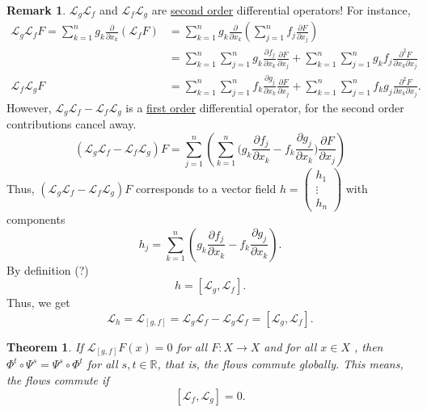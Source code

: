 \documentclass[hidelinks,a4paper, 11pt]{article}
\theoremstyle{plain}
\newtheorem{theorem}{Theorem}
\theoremstyle{break}
\theoremstyle{plain}
\theoremstyle{definition}
\newtheorem*{remark}{Remark}
\begin{document}
\begin{remark}
	$\mathcal L_g \mathcal L_f$ and $\mathcal L_f \mathcal L_g$ are \underline{second order} differential operators! For instance,
	\begin{align*}
		\mathcal L_g\mathcal L_f F = \sum^n_{k=1} g_k \frac{\partial}{\partial x_k}(\mathcal L_f F) &= \sum^n_{k=1} g_k \frac{\partial}{\partial x_k} \left( \sum^n_{j=1} f_j \frac{\partial F}{\partial x_j} \right) \\
		&= \sum^n_{k=1} \sum^n_{j=1} g_k \frac{\partial f_j}{\partial x_k} \frac{\partial F}{\partial x_j} + \sum^n_{k=1}\sum^n_{j=1}g_kf_j \frac{\partial^2F}{\partial x_k \partial x_j} \\
		\mathcal L_f \mathcal L_g F &= \sum^n_{k=1} \sum^n_{j=1} f_k \frac{\partial g_j}{\partial x_k} \frac{\partial F}{\partial x_j} + \sum^n_{k=1} \sum^n_{j=1}f_kg_j \frac{\partial^2F}{\partial x_k \partial x_j}.
	\end{align*}
	However, $\mathcal L_g \mathcal L_f - \mathcal L_f \mathcal L_g$ is a \underline{first order} differential operator, for the second order contributions cancel away.
	\[
		(\mathcal L_g \mathcal L_f - \mathcal L_f \mathcal L_g)F = \sum^n_{j=1}\left (\sum^n_{k=1}\big(g_k \frac{\partial f_j}{\partial x_k} - f_k \frac{\partial g_j}{\partial x_k}\big) \frac{\partial F}{\partial x_j}\right )
	\]
	Thus, $(\mathcal L_g \mathcal L_f - \mathcal L_f \mathcal L_g)F$ corresponds to a vector field $h = \begin{pmatrix}h_1 \\ \vdots \\ h_n \end{pmatrix}$ with components 
	\[
		h_j = \sum^n_{k=1}\left( g_k \frac{\partial f_j}{\partial x_k} - f_k \frac{\partial g_j}{\partial x_k} \right).
	\]
	By definition (?)
	\[
		h = [\mathcal L_g,\mathcal L_f].
	\]
	Thus, we get
	\[
		\mathcal L_h = \mathcal L_{[g,f]} = \mathcal L_g \mathcal L_f - \mathcal L_g \mathcal L_f = [\mathcal L_g, \mathcal L_f].
	\]
\end{remark}

\begin{theorem}
	If $\mathcal L_{[g,f]}F(x) = 0$ for all $F: X\to X$ and for all $x \in X$ , then $\Phi^t \circ \Psi^s = \Psi^s \circ \Phi^t$ for all $s,t \in \mathbb R$, that is, the flows commute globally. This means, the flows commute if 
	\[
		[\mathcal L_f,\mathcal L_g] = 0.
	\]
\end{theorem}
\end{document}
